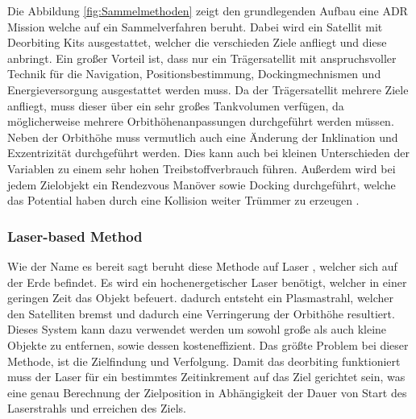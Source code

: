 	
Die Abbildung \ref{fig:Sammelmethoden} zeigt den grundlegenden Aufbau eine ADR Mission welche auf ein Sammelverfahren beruht. Dabei wird ein Satellit mit Deorbiting Kits ausgestattet, welcher die verschieden Ziele anfliegt und diese anbringt. Ein großer Vorteil ist, dass nur ein Trägersatellit mit anspruchsvoller Technik für die Navigation, Positionsbestimmung, Dockingmechnismen und Energieversorgung ausgestattet werden muss. Da der Trägersatellit mehrere Ziele anfliegt, muss dieser über ein sehr großes Tankvolumen verfügen, da möglicherweise mehrere Orbithöhenanpassungen  durchgeführt werden müssen. Neben der Orbithöhe muss vermutlich auch eine Änderung der Inklination und Exzentrizität durchgeführt werden. Dies kann auch bei kleinen Unterschieden der Variablen zu einem sehr hohen Treibstoffverbrauch führen. Außerdem wird bei jedem Zielobjekt ein Rendezvous Manöver sowie Docking durchgeführt, welche das Potential haben durch eine Kollision weiter Trümmer zu erzeugen \cite{Peters.2016, Mark.2019}.

			\subsubsection{Laser-based Method}
	
	Wie der Name es bereit sagt beruht diese Methode auf Laser , welcher sich auf der Erde befindet. Es wird ein hochenergetischer Laser benötigt, welcher in einer geringen Zeit das Objekt befeuert. dadurch entsteht ein Plasmastrahl, welcher den Satelliten bremst und dadurch eine Verringerung der Orbithöhe resultiert. Dieses System kann dazu verwendet werden um sowohl große als auch kleine Objekte zu entfernen, sowie dessen kosteneffizient. Das größte Problem bei dieser Methode, ist die Zielfindung und Verfolgung. Damit das deorbiting funktioniert muss der Laser für ein bestimmtes Zeitinkrement auf das Ziel gerichtet sein, was eine genau Berechnung der Zielposition in Abhängigkeit der Dauer von Start des Laserstrahls und erreichen des Ziels.\cite{Phipps.2012,Mark.2019}

